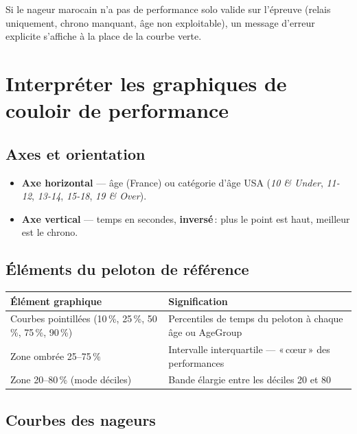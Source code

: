 \documentclass[11pt,a4paper]{article}
\begin{document}
\noindent Si le nageur marocain n'a pas de performance solo valide sur l'épreuve (relais uniquement, chrono manquant, âge non exploitable), un message d'erreur explicite s'affiche à la place de la courbe verte.

\section{Interpréter les graphiques de couloir de performance}

\subsection{Axes et orientation}

\begin{itemize}
  \item \textbf{Axe horizontal} --- âge (France) ou catégorie d'âge USA (\emph{10 \& Under}, \emph{11-12}, \emph{13-14}, \emph{15-18}, \emph{19 \& Over}).
  \item \textbf{Axe vertical} --- temps en secondes, \textbf{inversé}\,: plus le point est haut, meilleur est le chrono.
\end{itemize}

\subsection{Éléments du peloton de référence}

\begin{center}
\begin{tabular}{lp{9.5cm}}
\hline
\textbf{Élément graphique} & \textbf{Signification} \\
\hline
Courbes pointillées (10\,\%, 25\,\%, 50\,\%, 75\,\%, 90\,\%) & Percentiles de temps du peloton à chaque âge ou AgeGroup \\
Zone ombrée 25--75\,\% & Intervalle interquartile --- «\,cœur\,» des performances \\
Zone 20--80\,\% (mode déciles) & Bande élargie entre les déciles 20 et 80 \\
\hline
\end{tabular}
\end{center}

\subsection{Courbes des nageurs}
\end{document}
